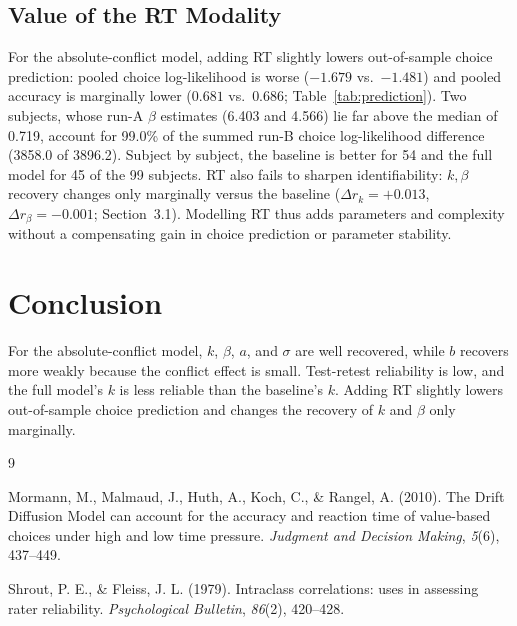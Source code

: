 \documentclass[11pt,a4paper]{article}
\begin{document}
	\subsection{Value of the RT Modality}
	
	For the absolute-conflict model, adding RT slightly lowers out-of-sample choice prediction: pooled choice log-likelihood is worse ($-1.679$ vs.\ $-1.481$) and pooled accuracy is marginally lower ($0.681$ vs.\ $0.686$; Table~\ref{tab:prediction}). Two subjects, whose run-A $\beta$ estimates (6.403 and 4.566) lie far above the median of 0.719, account for 99.0\% of the summed run-B choice log-likelihood difference (3858.0 of 3896.2). Subject by subject, the baseline is better for 54 and the full model for 45 of the 99 subjects. RT also fails to sharpen identifiability: $k,\beta$ recovery changes only marginally versus the baseline ($\Delta r_k=+0.013$, $\Delta r_\beta=-0.001$; Section~3.1). Modelling RT thus adds parameters and complexity without a compensating gain in choice prediction or parameter stability.
	
	\section{Conclusion}
	
	For the absolute-conflict model, $k$, $\beta$, $a$, and $\sigma$ are well recovered, while $b$ recovers more weakly because the conflict effect is small. Test-retest reliability is low, and the full model's $k$ is less reliable than the baseline's $k$. Adding RT slightly lowers out-of-sample choice prediction and changes the recovery of $k$ and $\beta$ only marginally.
	
	\begin{thebibliography}{9}
		
		Mormann, M., Malmaud, J., Huth, A., Koch, C., \& Rangel, A. (2010). The Drift Diffusion Model can account for the accuracy and reaction time of value-based choices under high and low time pressure. \textit{Judgment and Decision Making}, \textit{5}(6), 437--449.
		
		Shrout, P. E., \& Fleiss, J. L. (1979). Intraclass correlations: uses in assessing rater reliability. \textit{Psychological Bulletin}, \textit{86}(2), 420--428.
		
	\end{thebibliography}
	
\end{document}
